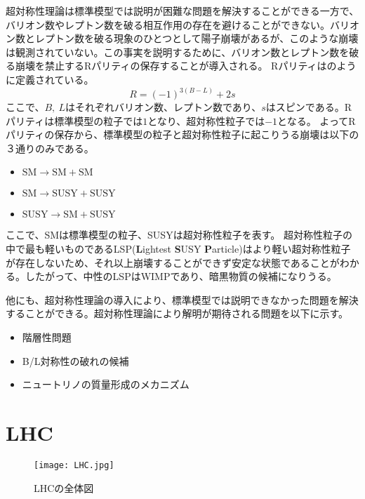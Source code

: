 超対称性理論は標準模型では説明が困難な問題を解決することができる一方で、バリオン数やレプトン数を破る相互作用の存在を避けることができない。バリオン数とレプトン数を破る現象のひとつとして陽子崩壊があるが、このような崩壊は観測されていない。この事実を説明するために、バリオン数とレプトン数を破る崩壊を禁止するRパリティの保存することが導入される。
Rパリティはのように定義されている。
\begin{equation}
  \label{eq:r}
  R = (-1)^{3(B-L)}+2s
\end{equation}
ここで、$B,\ L$はそれぞれバリオン数、レプトン数であり、$s$はスピンである。Rパリティは標準模型の粒子では$1$となり、超対称性粒子では$-1$となる。
よってRパリティの保存から、標準模型の粒子と超対称性粒子に起こりうる崩壊は以下の３通りのみである。
\begin{itemize}
  \item $\mathrm{SM} \to \mathrm{SM} + \mathrm{SM}$
  \item $\mathrm{SM} \to \mathrm{SUSY} + \mathrm{SUSY}$
  \item $\mathrm{SUSY} \to \mathrm{SM} + \mathrm{SUSY}$
\end{itemize}
ここで、SMは標準模型の粒子、SUSYは超対称性粒子を表す。
超対称性粒子の中で最も軽いものであるLSP(\textbf{L}ightest \textbf{S}USY \textbf{P}article)はより軽い超対称性粒子が存在しないため、それ以上崩壊することができず安定な状態であることがわかる。したがって、中性のLSPはWIMPであり、暗黒物質の候補になりうる。



他にも、超対称性理論の導入により、標準模型では説明できなかった問題を解決することができる。超対称性理論により解明が期待される問題を以下に示す。
\begin{itemize}
  \item 階層性問題
  \item B/L対称性の破れの候補
  \item ニュートリノの質量形成のメカニズム
\end{itemize}


\section{LHC}
\label{sec:LHC}
\begin{figure}[tbp]
  \centering
  \texttt{[image: LHC.jpg]}
  \caption[LHCの全体図]{LHCの全体図 \cite{LHC} }
  \label{fig:LHC}
\end{figure}

